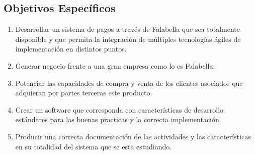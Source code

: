 \documentclass[a4paper,12pt,openany,oneside]{book}
\begin{document}
\subsection{Objetivos Específicos}
\begin{enumerate}
\item Desarrollar un sistema de pagos a través de Falabella que sea totalmente disponible y que permita la integración de múltiples tecnologías ágiles de implementación en distintos puntos.
\item Generar negocio frente a una gran empresa como lo es Falabella.
\item Potenciar las capacidades de compra y venta de los clientes asociados que adquieran por partes terceras este producto.
\item Crear un software que corresponda con características de desarrollo estándares para las buenas practicas y la correcta implementación.
\item Producir una correcta documentación de las actividades y las características en su totalidad del sistema que se esta estudiando.
\end{enumerate}
\end{document}
